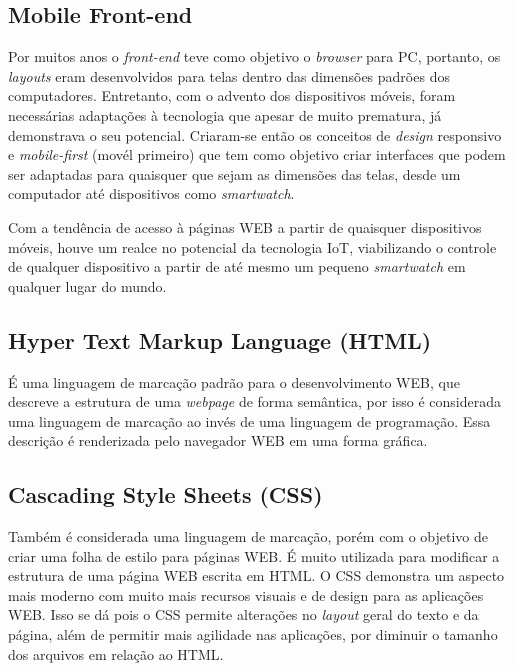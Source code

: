 \documentclass[../../layout.tex]{subfiles}
\begin{document}
\subsection{Mobile Front-end}
\hspace*{3em}Por  muitos anos o \emph{front-end} teve como objetivo o \emph{browser} para PC, portanto, os \emph{layouts} eram desenvolvidos para telas dentro das dimensões padrões dos computadores. Entretanto, com o advento dos dispositivos móveis, foram necessárias adaptações à tecnologia que apesar de muito prematura, já demonstrava o seu potencial. Criaram-se então os conceitos de \emph{design} responsivo e \emph{mobile-first} (movél primeiro) que tem como objetivo criar interfaces que podem ser adaptadas para quaisquer que sejam as dimensões das telas, desde um computador até dispositivos como \emph{smartwatch}.\par
Com a tendência de acesso à páginas WEB a partir de quaisquer dispositivos móveis, houve um realce no potencial da tecnologia IoT, viabilizando o controle de qualquer dispositivo a partir de até mesmo um pequeno \emph{smartwatch} em qualquer lugar do mundo.\cite{mobilefrontend}

\subsection{Hyper Text Markup Language (HTML)}
\hspace*{3em}É uma linguagem de marcação padrão para o desenvolvimento WEB, que descreve a estrutura de uma \emph{webpage} de forma semântica, por isso é considerada uma linguagem de marcação ao invés de uma linguagem de programação. Essa descrição é renderizada pelo navegador WEB em uma forma gráfica.\cite{frontend}

\subsection{Cascading Style Sheets (CSS)}
\hspace*{3em}Também é considerada uma linguagem de marcação, porém com o objetivo de criar uma folha de estilo para páginas WEB. É muito utilizada para modificar a estrutura de uma página WEB escrita em HTML. O CSS demonstra um aspecto mais moderno com muito mais recursos visuais e de design para as aplicações WEB. Isso se dá pois o CSS permite alterações no \emph{layout} geral do texto e da página, além de permitir mais agilidade nas aplicações, por diminuir o tamanho dos arquivos em relação ao HTML.\cite{frontend}
\end{document}

